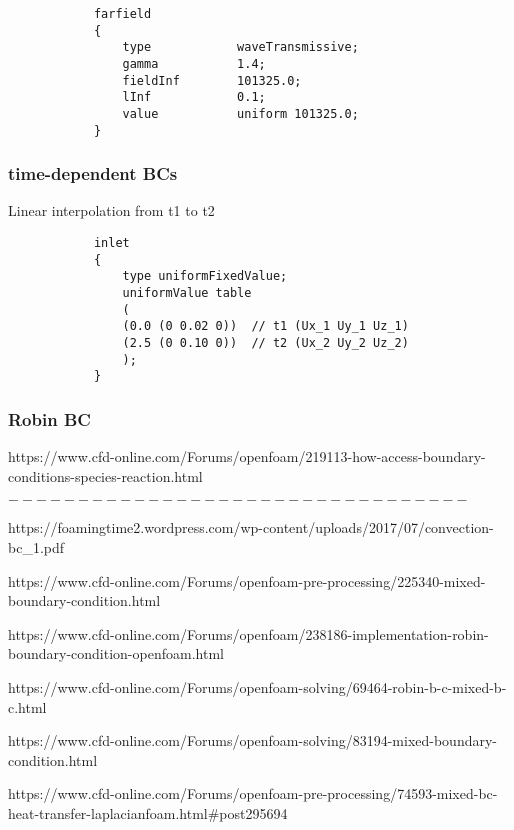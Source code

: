 \documentclass[a4paper, 12pt]{article}
\numberwithin{equation}{section}
\begin{document}
            {
            \begin{verbatim}
            farfield
            {
                type            waveTransmissive;
                gamma           1.4;
                fieldInf        101325.0;
                lInf            0.1;
                value           uniform 101325.0;
            }
            \end{verbatim}
            }

        \subsubsection{time-dependent BCs}

            Linear interpolation from t1 to t2

            {
            \begin{verbatim}
            inlet
            {
                type uniformFixedValue;
                uniformValue table
                (
                (0.0 (0 0.02 0))  // t1 (Ux_1 Uy_1 Uz_1)
                (2.5 (0 0.10 0))  // t2 (Ux_2 Uy_2 Uz_2)
                );
            }
            \end{verbatim}
            }

        \subsubsection{Robin BC}

            https://www.cfd-online.com/Forums/openfoam/219113-how-access-boundary-conditions-species-reaction.html

            $---------------------------------$

            https://foamingtime2.wordpress.com/wp-content/uploads/2017/07/convection-bc\_1.pdf

            https://www.cfd-online.com/Forums/openfoam-pre-processing/225340-mixed-boundary-condition.html

            https://www.cfd-online.com/Forums/openfoam/238186-implementation-robin-boundary-condition-openfoam.html

            https://www.cfd-online.com/Forums/openfoam-solving/69464-robin-b-c-mixed-b-c.html

            https://www.cfd-online.com/Forums/openfoam-solving/83194-mixed-boundary-condition.html

            https://www.cfd-online.com/Forums/openfoam-pre-processing/74593-mixed-bc-heat-transfer-laplacianfoam.html\#post295694
\end{document}
